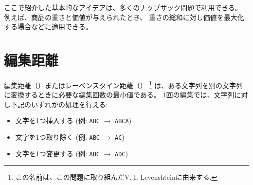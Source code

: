 \begin{comment}
Note that the general idea presented here can be used
in many knapsack problems.
For example, if we are given objects with weights and values,
we can determine for each weight sum the maximum value
sum of a subset.
\end{comment}

ここで紹介した基本的なアイデアは、多くのナップサック問題で利用できる。
例えば、商品の重さと価値が与えられたとき、
重さの総和に対し価値を最大化する場合などに適用できる。

\begin{comment}
\section{Edit distance}

\index{edit distance}
\index{Levenshtein distance}

The \key{edit distance} or \key{Levenshtein distance}\footnote{The distance
is named after V. I. Levenshtein who studied it in connection with binary codes \cite{lev66}.}
is the minimum number of editing operations
needed to transform a string
into another string.
The allowed editing operations are as follows:
\begin{itemize}
\item insert a character (e.g. \texttt{ABC} $\rightarrow$ \texttt{ABCA})
\item remove a character (e.g. \texttt{ABC} $\rightarrow$ \texttt{AC})
\item modify a character (e.g. \texttt{ABC} $\rightarrow$ \texttt{ADC})
\end{itemize}

For example, the edit distance between
\texttt{LOVE} and \texttt{MOVIE} is 2,
because we can first perform the operation
 \texttt{LOVE} $\rightarrow$ \texttt{MOVE}
(modify) and then the operation
\texttt{MOVE} $\rightarrow$ \texttt{MOVIE}
(insert).
This is the smallest possible number of operations,
because it is clear that only one operation is not enough.
\end{comment}

\section{編集距離}


編集距離（）またはレーベンスタイン距離（）
\footnote{この名前は、この問題に取り組んだV. I. Levenshteinに由来する\cite{lev66}.}
は、ある文字列を別の文字列に変換するときに必要な編集回数の最小値である。
1回の編集では、文字列に対し下記のいずれかの処理を行える:
\begin{itemize}
\item 文字を1つ挿入する (例: \texttt{ABC} $\rightarrow$ \texttt{ABCA})
\item 文字を1つ取り除く (例: \texttt{ABC} $\rightarrow$ \texttt{AC})
\item 文字を1つ変更する (例: \texttt{ABC} $\rightarrow$ \texttt{ADC})
\end{itemize}

